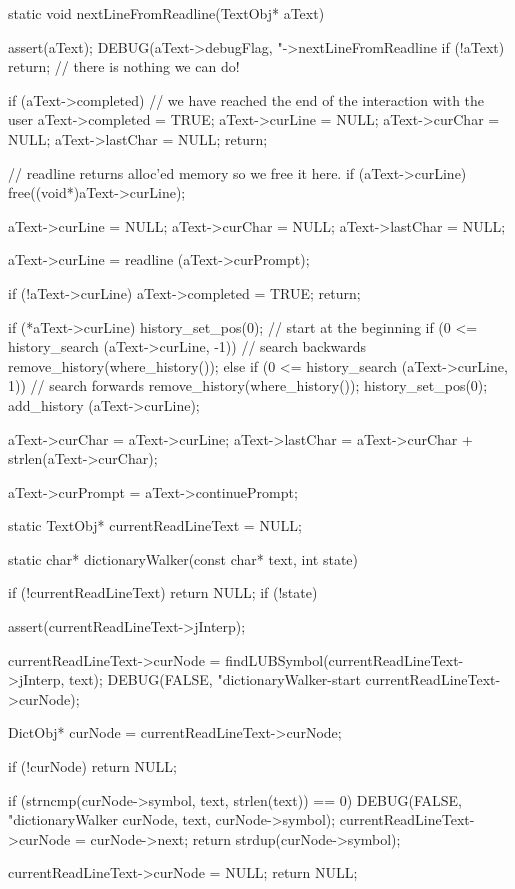 \startCCode
static void nextLineFromReadline(TextObj* aText) {
  assert(aText);
  DEBUG(aText->debugFlag, "->nextLineFromReadline %
  if (!aText) return; // there is nothing we can do!

  if (aText->completed) {
    // we have reached the end of the interaction with the user
    aText->completed = TRUE;
    aText->curLine   = NULL;
    aText->curChar   = NULL;
    aText->lastChar  = NULL;
    return;
  }

  // readline returns alloc'ed memory so we free it here.
  if (aText->curLine) free((void*)aText->curLine);

  aText->curLine  = NULL;
  aText->curChar  = NULL;
  aText->lastChar = NULL;

  aText->curLine = readline (aText->curPrompt);

  if (!aText->curLine) {
    aText->completed = TRUE;
    return;
  }

  if (*aText->curLine) {
    history_set_pos(0); // start at the beginning
    if (0 <= history_search (aText->curLine, -1)) { // search backwards
      remove_history(where_history());
    } else if (0 <= history_search (aText->curLine, 1)) { // search forwards
      remove_history(where_history());
    }
    history_set_pos(0);
    add_history (aText->curLine);
  }

  aText->curChar  = aText->curLine;
  aText->lastChar = aText->curChar + strlen(aText->curChar);

  aText->curPrompt = aText->continuePrompt;
}
\stopCCode

\startCCode
static TextObj* currentReadLineText = NULL;
\stopCCode

\startCCode
static char* dictionaryWalker(const char* text, int state) {
  if (!currentReadLineText) return NULL;
  if (!state) {

    assert(currentReadLineText->jInterp);

    currentReadLineText->curNode =
      findLUBSymbol(currentReadLineText->jInterp, text);
    DEBUG(FALSE, "dictionaryWalker-start %
          currentReadLineText->curNode);
  }
  DictObj* curNode = currentReadLineText->curNode;

  if (!curNode) return NULL;

  if (strncmp(curNode->symbol, text, strlen(text)) == 0) {
    DEBUG(FALSE, "dictionaryWalker %
          curNode, text, curNode->symbol);
    currentReadLineText->curNode = curNode->next;
    return strdup(curNode->symbol);
  }

  currentReadLineText->curNode = NULL;
  return NULL;
}

